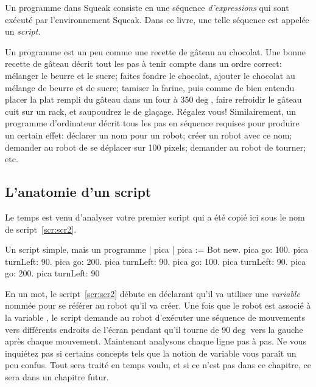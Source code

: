 \documentclass[a4paper,10pt,twoside]{book}
\begin{document}
Un programme dans Squeak consiste en une s\'equence \emph{d'expressions} qui sont ex\'ecut\'e par l'environnement Squeak. Dans ce livre, une telle s\'equence est appel\'ee un \emph{script}.


Un programme est un peu comme une recette de g\^ateau au chocolat. Une bonne recette de g\^ateau d\'ecrit tout les pas \`a tenir compte dans un ordre correct: m\'elanger le beurre et le sucre; faites fondre le chocolat, ajouter le chocolat au m\'elange de beurre et de sucre; tamiser la farine, puis comme de bien entendu placer la plat rempli du g\^ateau dans un four \`a 350$\deg$, faire refroidir le g\^ateau cuit sur un rack, et saupoudrez le de gla\c cage. R\'egalez vous! Similairement, un programme d'ordinateur d\'ecrit tous les pas en s\'equence requises pour produire un certain effet: d\'eclarer un nom pour un robot; cr\'eer un robot avec ce nom; demander au robot de se d\'eplacer sur 100 pixels; demander au robot de tourner; etc.

\subsection{L'anatomie d'un script}

Le temps est venu d'analyser votre premier script qui a \'et\'e copi\'e ici sous le nom de script~\ref{scr:scr2}. 

\begin{script}[scr2]{Un script simple, mais un programme}
	| pica | 
	pica := Bot new. 
	pica go: 100. 
	pica turnLeft: 90. 
	pica go: 200. 
	pica turnLeft: 90. 
	pica go: 100. 
	pica turnLeft: 90. 
	pica go: 200. 
	pica turnLeft: 90 
\end{script}

En un mot, le script~\ref{scr:scr2} d\'ebute en d\'eclarant qu'il va utiliser une \emph{variable} nomm\'ee  pour se r\'ef\'erer au robot qu'il va cr\'eer. Une fois que le robot est associ\'e \`a la variable , le script demande au robot d'ex\'ecuter une s\'equence de mouvements vers diff\'erents endroits de l'\'ecran pendant qu'il tourne de 90$\deg$ vers la gauche apr\`es chaque mouvement. Maintenant analysons chaque ligne pas \`a pas. Ne vous inqui\'etez pas si certains concepts tels que la notion de variable vous para\^it un peu confus. Tout sera trait\'e en temps voulu, et si ce n'est pas dans ce chapitre, ce sera dans un chapitre futur.
\end{document}
